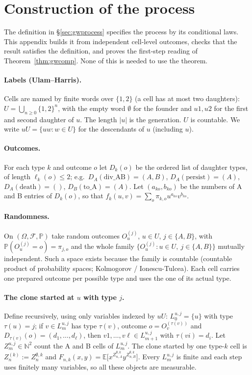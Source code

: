 \documentclass[11pt]{article}
\theoremstyle{definition}
\theoremstyle{remark}
\newcommand{\E}{\mathbb{E}}
\newcommand{\Prob}{\mathbb{P}}
\begin{document}
\appendix
\section{Construction of the process}\label{app:construction}
The definition in \S\ref{sec:gwprocess} specifies the process by its conditional laws. This appendix builds it from independent cell-level outcomes, checks that the result satisfies the definition, and proves the first-step reading of Theorem~\ref{thm:gwcomp}. None of this is needed to use the theorem.

\paragraph{Labels (Ulam--Harris).} Cells are named by finite words over $\{1,2\}$ (a cell has at most two daughters): $U=\bigcup_{n\ge0}\{1,2\}^n$, with the empty word $\emptyset$ for the founder and $u1,u2$ for the first and second daughter of $u$. The length $|u|$ is the generation. $U$ is countable. We write $uU=\{uw:w\in U\}$ for the descendants of $u$ (including $u$).

\paragraph{Outcomes.} For each type $k$ and outcome $o$ let $D_k(o)$ be the ordered list of daughter types, of length $\ell_k(o)\le2$; e.g.\ $D_A(\mathrm{div\_AB})=(A,B)$, $D_A(\mathrm{persist})=(A)$, $D_A(\mathrm{death})=()$, $D_B(\mathrm{to\_A})=(A)$. Let $(a_{ko},b_{ko})$ be the numbers of A and B entries of $D_k(o)$, so that $f_k(u,v)=\sum_o\pi_{k,o}u^{a_{ko}}v^{b_{ko}}$.

\paragraph{Randomness.} On $(\Omega,\mathcal F,\Prob)$ take random outcomes $O_u^{(j)}$, $u\in U$, $j\in\{A,B\}$, with $\Prob(O_u^{(j)}=o)=\pi_{j,o}$ and the whole family $\{O_u^{(j)}:u\in U,\ j\in\{A,B\}\}$ mutually independent. Such a space exists because the family is countable (countable product of probability spaces; Kolmogorov / Ionescu-Tulcea). Each cell carries one prepared outcome per possible type and uses the one of its actual type.

\paragraph{The clone started at $u$ with type $j$.} Define recursively, using only variables indexed by $uU$: $L_0^{u,j}=\{u\}$ with type $\tau(u)=j$; if $v\in L_m^{u,j}$ has type $\tau(v)$, outcome $o=O_v^{(\tau(v))}$ and $D_{\tau(v)}(o)=(d_1,\dots,d_\ell)$, then $v1,\dots,v\ell\in L_{m+1}^{u,j}$ with $\tau(vi)=d_i$. Let $Z_m^{u,j}\in\mathbb N^2$ count the A and B cells of $L_m^{u,j}$. The clone started by one type-$k$ cell is $Z_n^{(k)}:=Z_n^{\emptyset,k}$ and $F_{n,k}(x,y)=\E\big[x^{Z^{\emptyset,k}_{n,A}}y^{Z^{\emptyset,k}_{n,B}}\big]$. Every $L_m^{u,j}$ is finite and each step uses finitely many variables, so all these objects are measurable.
\end{document}
